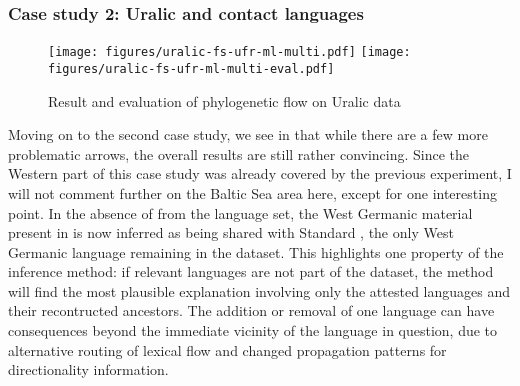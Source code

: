  \subsubsection{Case study 2: Uralic and contact languages}
 \begin{sidewaysfigure}
 \texttt{[image: figures/uralic-fs-ufr-ml-multi.pdf]}
 \vspace*{5mm}
 \texttt{[image: figures/uralic-fs-ufr-ml-multi-eval.pdf]}
 \caption{Result and evaluation of phylogenetic flow on Uralic data}
 \label{uralic-result-phylo}
 \end{sidewaysfigure}
 Moving on to the second case study, we see in  that while there are a few more problematic arrows, the overall results are still rather convincing. Since the Western part of this case study was already covered by the previous experiment, I will not comment further on the Baltic Sea area here, except for one interesting point. In the absence of  from the language set, the West Germanic material present in  is now inferred as being shared with Standard , the only West Germanic language remaining in the dataset. This highlights one property of the inference method: if relevant languages are not part of the dataset, the method will find the most plausible explanation involving only the attested languages and their recontructed ancestors. The addition or removal of one language can have consequences beyond the immediate vicinity of the language in question, due to alternative routing of lexical flow and changed propagation patterns for directionality information.
 
